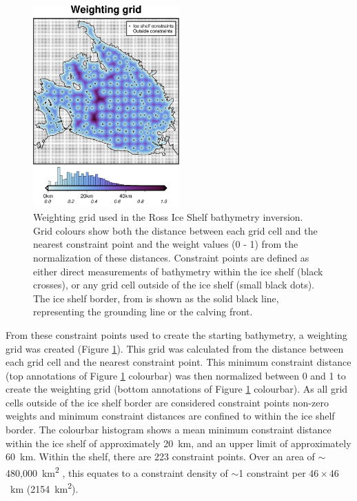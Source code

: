 \begin{figure}[!ht]
    \centering
    \includegraphics[width=0.5\textwidth]{figures/chp4/RIS_weighting_grid.png}
    \caption[Ross Ice Shelf weighting grid]{Weighting grid used in the Ross Ice Shelf bathymetry inversion. Grid colours show both the distance between each grid cell and the nearest constraint point and the weight values (0 - 1) from the normalization of these distances. Constraint points are defined as either direct measurements of bathymetry within the ice shelf (black crosses), or any grid cell outside of the ice shelf (small black dots). The ice shelf border, from \citet{mouginotmeasures2017} is shown as the solid black line, representing the grounding line or the calving front.}
    \label{fig:chp4_RIS_weighting_grid}
\end{figure}

From these constraint points used to create the starting bathymetry, a weighting grid was created (Figure \ref{fig:chp4_RIS_weighting_grid}). This grid was calculated from the distance between each grid cell and the nearest constraint point. This minimum constraint distance (top annotations of Figure \ref{fig:chp4_RIS_weighting_grid} colourbar) was then normalized between 0 and 1 to create the weighting grid (bottom annotations of Figure \ref{fig:chp4_RIS_weighting_grid} colourbar). As all grid cells outside of the ice shelf border are considered constraint points non-zero weights and  minimum constraint distances are confined to within the ice shelf border. The colourbar histogram shows a mean minimum constraint distance within the ice shelf of approximately 20~km, and an upper limit of approximately 60~km. Within the shelf, there are 223 constraint points. Over an area of $\sim$480,000~km\textsuperscript{2} \citep{mouginotmeasures2017}, this equates to a constraint density of $\sim$1 constraint per $46\times46$~km (2154~km\textsuperscript{2}).\\


